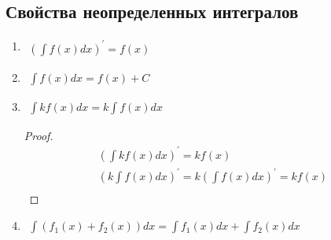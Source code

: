 \documentclass[12pt, fleqn]{book}
\begin{document}
	\subsection{Свойства неопределенных интегралов}
	\begin{enumerate}[1)]
		\item $\begin{gathered}
		 	\left(\int f(x)dx\right)^\prime=f(x)
		 \end{gathered}$
		\item 
		$\begin{gathered}
			\int f(x)dx=f(x) + C
		\end{gathered}$
		\item 
	$	\begin{gathered}
			\int kf(x)dx=k\int f(x)dx
		\end{gathered}$
		\begin{proof}
			\begin{multline*}
				\left(\int kf(x)dx\right)^\prime=kf(x)\\
				\left(k\int f(x)dx\right)^\prime=k\left(\int f(x) dx\right)^\prime=kf(x)\\
			\end{multline*}
		\end{proof}
		\item $\begin{gathered}
			\int \left(f_1(x) + f_2(x)\right)dx = \int f_1(x) dx + \int f_2(x) dx
		\end{gathered}$
	\end{enumerate}
\end{document}
